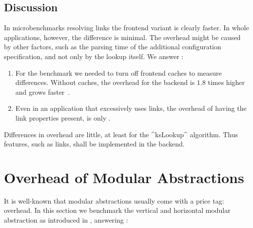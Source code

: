 \subsection{Discussion}

In microbenchmarks resolving links the frontend variant is clearly faster.
In whole applications, however, the difference is minimal.
The overhead might be caused by other factors, such as the parsing time of the additional configuration specification, and not only by the lookup itself.
We answer :
\rqComparisonFrontendBackend*

\begin{finding}
\fixtheorem
\begin{enumerate}
\item
For the benchmark we needed to turn off frontend caches to measure differences.
Without caches, the overhead for the backend is $1.8$ times higher and grows  faster~\cite{raab2015kps}.
\item
Even in an application that excessively uses links, the overhead of having the link properties present, is only .
\end{enumerate}

\begin{implication}
Differences in overhead are little, at least for the ^ksLookup^ algorithm.
Thus features, such as links, shall be implemented in the backend.
\end{implication}
\end{finding}


























\section{Overhead of Modular Abstractions}
\label{sec:evaluation-modular}

It is well-known that modular abstractions usually come with a price tag: overhead.
In this section we benchmark the vertical and horizontal modular abstraction as introduced in , answering :
\rqOverheadModularity*

